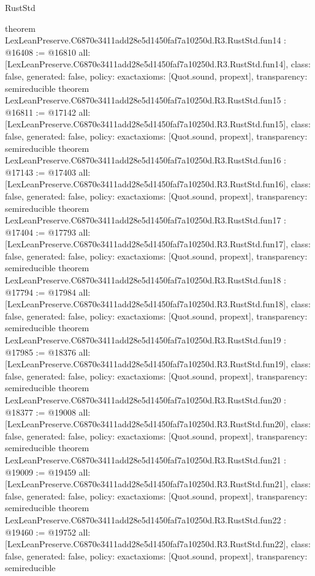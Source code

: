 \begin{lexlean}{RustStd}
\begin{coremodule}
{}
theorem LexLeanPreserve.C6870e3411add28e5d1450faf7a10250d.R3.RustStd.fun14 : @16408 := @16810 {
  all: [LexLeanPreserve.C6870e3411add28e5d1450faf7a10250d.R3.RustStd.fun14],
  class: false,
  generated: false,
  policy: exact{axioms: [Quot.sound, propext]},
  transparency: semireducible
}
theorem LexLeanPreserve.C6870e3411add28e5d1450faf7a10250d.R3.RustStd.fun15 : @16811 := @17142 {
  all: [LexLeanPreserve.C6870e3411add28e5d1450faf7a10250d.R3.RustStd.fun15],
  class: false,
  generated: false,
  policy: exact{axioms: [Quot.sound, propext]},
  transparency: semireducible
}
theorem LexLeanPreserve.C6870e3411add28e5d1450faf7a10250d.R3.RustStd.fun16 : @17143 := @17403 {
  all: [LexLeanPreserve.C6870e3411add28e5d1450faf7a10250d.R3.RustStd.fun16],
  class: false,
  generated: false,
  policy: exact{axioms: [Quot.sound, propext]},
  transparency: semireducible
}
theorem LexLeanPreserve.C6870e3411add28e5d1450faf7a10250d.R3.RustStd.fun17 : @17404 := @17793 {
  all: [LexLeanPreserve.C6870e3411add28e5d1450faf7a10250d.R3.RustStd.fun17],
  class: false,
  generated: false,
  policy: exact{axioms: [Quot.sound, propext]},
  transparency: semireducible
}
theorem LexLeanPreserve.C6870e3411add28e5d1450faf7a10250d.R3.RustStd.fun18 : @17794 := @17984 {
  all: [LexLeanPreserve.C6870e3411add28e5d1450faf7a10250d.R3.RustStd.fun18],
  class: false,
  generated: false,
  policy: exact{axioms: [Quot.sound, propext]},
  transparency: semireducible
}
theorem LexLeanPreserve.C6870e3411add28e5d1450faf7a10250d.R3.RustStd.fun19 : @17985 := @18376 {
  all: [LexLeanPreserve.C6870e3411add28e5d1450faf7a10250d.R3.RustStd.fun19],
  class: false,
  generated: false,
  policy: exact{axioms: [Quot.sound, propext]},
  transparency: semireducible
}
theorem LexLeanPreserve.C6870e3411add28e5d1450faf7a10250d.R3.RustStd.fun20 : @18377 := @19008 {
  all: [LexLeanPreserve.C6870e3411add28e5d1450faf7a10250d.R3.RustStd.fun20],
  class: false,
  generated: false,
  policy: exact{axioms: [Quot.sound, propext]},
  transparency: semireducible
}
theorem LexLeanPreserve.C6870e3411add28e5d1450faf7a10250d.R3.RustStd.fun21 : @19009 := @19459 {
  all: [LexLeanPreserve.C6870e3411add28e5d1450faf7a10250d.R3.RustStd.fun21],
  class: false,
  generated: false,
  policy: exact{axioms: [Quot.sound, propext]},
  transparency: semireducible
}
theorem LexLeanPreserve.C6870e3411add28e5d1450faf7a10250d.R3.RustStd.fun22 : @19460 := @19752 {
  all: [LexLeanPreserve.C6870e3411add28e5d1450faf7a10250d.R3.RustStd.fun22],
  class: false,
  generated: false,
  policy: exact{axioms: [Quot.sound, propext]},
  transparency: semireducible
}
\end{coremodule}
\end{lexlean}

